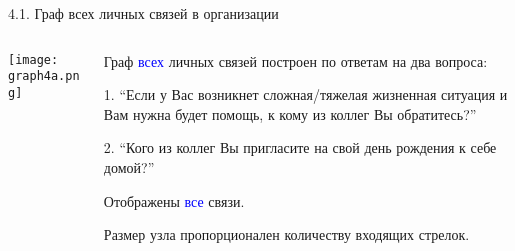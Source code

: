 \begin{frame}{4.1. Граф всех личных связей в организации}

\begin{columns}
\begin{column}{0.75\textwidth} 
\centering
          \texttt{[image: graph4a.png]}
\end{column}
\begin{column}{0.25\textwidth}
\tiny
Граф \textcolor{blue}{всех} личных связей построен по ответам на два вопроса:
\smallskip

1. ``Если у Вас возникнет сложная/тяжелая жизненная ситуация и Вам нужна будет помощь, к кому из коллег Вы обратитесь?''
\smallskip

2. ``Кого из коллег Вы пригласите на свой день рождения к себе домой?''
\smallskip

Отображены \textcolor{blue}{все} связи. 
\smallskip

Размер узла пропорционален количеству входящих стрелок.

\end{column}
\end{columns}
\end{frame}


